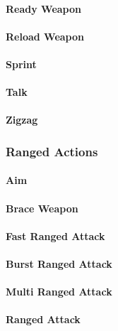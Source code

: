 \paragraph{Ready Weapon}

\paragraph{Reload Weapon}

\paragraph{Sprint}

\paragraph{Talk}

\paragraph{Zigzag}

\subsubsection{Ranged Actions}

\paragraph{Aim}

\paragraph{Brace Weapon}

\paragraph{Fast Ranged Attack}

\paragraph{Burst Ranged Attack}

\paragraph{Multi Ranged Attack}

\paragraph{Ranged Attack}

